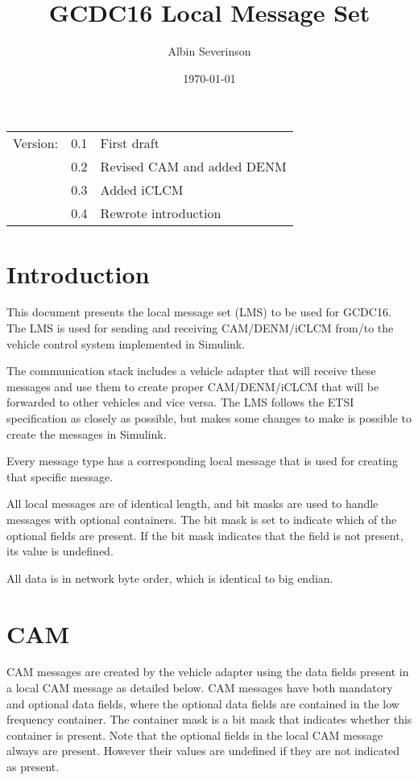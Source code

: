 \documentclass[11pt]{article}
\author{Albin Severinson}
\date{\today}
\title{GCDC16 Local Message Set}
\begin{document}
\maketitle
\tableofcontents

\begin{center}
\begin{tabular}{lrl}
Version: & 0.1 & First draft\\
 & 0.2 & Revised CAM and added DENM\\
 & 0.3 & Added iCLCM\\
 & 0.4 & Rewrote introduction\\
\end{tabular}
\end{center}

\newpage
\section{Introduction}
\label{sec:orgheadline1}
This document presents the local message set (LMS) to be used for
GCDC16. The LMS is used for sending and receiving CAM/DENM/iCLCM
from/to the vehicle control system implemented in Simulink.

The communication stack includes a vehicle adapter that will receive
these messages and use them to create proper CAM/DENM/iCLCM
that will be forwarded to other vehicles and vice versa. The LMS
follows the ETSI specification as closely as possible, but makes some
changes to make is possible to create the messages in Simulink.

Every message type has a corresponding local message that is used for
creating that specific message. 

All local messages are of identical length, and bit masks are used to
handle messages with optional containers. The bit mask is set to
indicate which of the optional fields are present. If the bit mask
indicates that the field is not present, its value is undefined.

All data is in network byte order, which is identical to big endian.

\newpage
\section{CAM}
\label{sec:orgheadline2}
CAM messages are created by the vehicle adapter using the data fields
present in a local CAM message as detailed below. CAM messages have
both mandatory and optional data fields, where the optional data
fields are contained in the low frequency container. The container
mask is a bit mask that indicates whether this container is present.
Note that the optional fields in the local CAM message always are
present. However their values are undefined if they are not indicated
as present.
\end{document}
